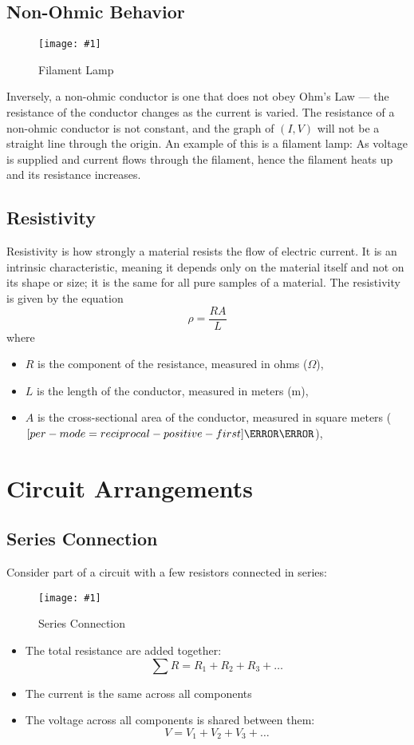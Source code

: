 \documentclass[a4paper,12pt]{article}
\let\oldsection\section
\renewcommand\section{\clearpage\oldsection}
\let\oldsi\si
\renewcommand{\si}[1]{\oldsi[per-mode=reciprocal-positive-first]{#1}}
\newcommand{\img}[4]{\begin{center}
  \begin{figure}[H]
    \centering
    \texttt{[image: \#1]}
    \caption{#3}
    \label{fig:#4}
  \end{figure}
\end{center}}
\begin{document}
\subsection{Non-Ohmic Behavior}
\img{bulb.png}{0.7}{Filament Lamp}{bulb}
Inversely, a non-ohmic conductor is one that does not obey Ohm's Law --- the resistance of the conductor changes as the current is varied. The resistance of a non-ohmic conductor is not constant, and the graph of $(I, V)$ will not be a straight line through the origin. An example of this is a filament lamp: As voltage is supplied and current flows through the filament, hence the filament heats up and its resistance increases.

\pagebreak

\subsection{Resistivity}

Resistivity is how strongly a material resists the flow of electric current. It is an intrinsic characteristic, meaning it depends only on the material itself and not on its shape or size; it is the same for all pure samples of a material. The resistivity is given by the equation
\begin{equation}
  \rho = \frac{RA}{L}
\end{equation}
where
\begin{itemize}
  \item $R$ is the component of the resistance, measured in ohms ($\Omega$),
  \item $L$ is the length of the conductor, measured in meters (m),
  \item $A$ is the cross-sectional area of the conductor, measured in square meters ($\si{\m\squared}$),
\end{itemize}


\section{Circuit Arrangements}

\subsection{Series Connection}

Consider part of a circuit with a few resistors connected in series:
\img{series.png}{0.9}{Series Connection}{series}
\begin{itemize}
  \item The total resistance are added together:
        $$\sum R = R_1 + R_2 + R_3 + \ldots$$
  \item The current is the same across all components
  \item The voltage across all components is shared between them:
        $$V = V_1 + V_2 + V_3 + \ldots$$
\end{itemize}
\end{document}
